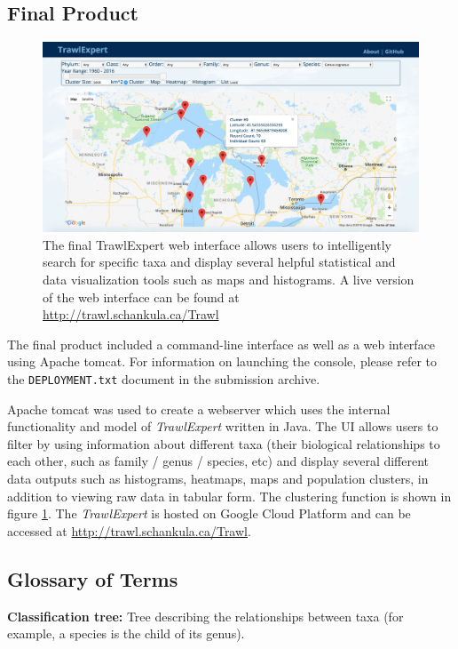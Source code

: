 \documentclass{article}
\begin{document}
\subsection{Final Product}
\begin{figure}
\centering
\includegraphics[width=16cm]{UI.png}
\caption{The final TrawlExpert web interface allows users to intelligently search for specific taxa and display several helpful statistical and data visualization tools such as maps and histograms. A live version of the web interface can be found at \url{http://trawl.schankula.ca/Trawl}}
\label{fig:UI}
\end{figure}

The final product included a command-line interface as well as a web interface using Apache tomcat. For information on launching the console, please refer to the \texttt{DEPLOYMENT.txt} document in the submission archive.

Apache tomcat was used to create a webserver which uses the internal functionality and model of \textit{TrawlExpert} written in Java. The UI allows users to filter by using information about different taxa (their biological relationships to each other, such as family / genus / species, etc) and display several different data outputs such as histograms, heatmaps, maps and population clusters, in addition to viewing raw data in tabular form. The clustering function is shown in figure \ref{fig:UI}. The \textit{TrawlExpert} is hosted on Google Cloud Platform and can be accessed at \url{http://trawl.schankula.ca/Trawl}. 

\subsection{Glossary of Terms}
\noindent\textbf{Classification tree:} Tree describing the relationships between taxa (for example, a species is the child of its genus).
\end{document}
